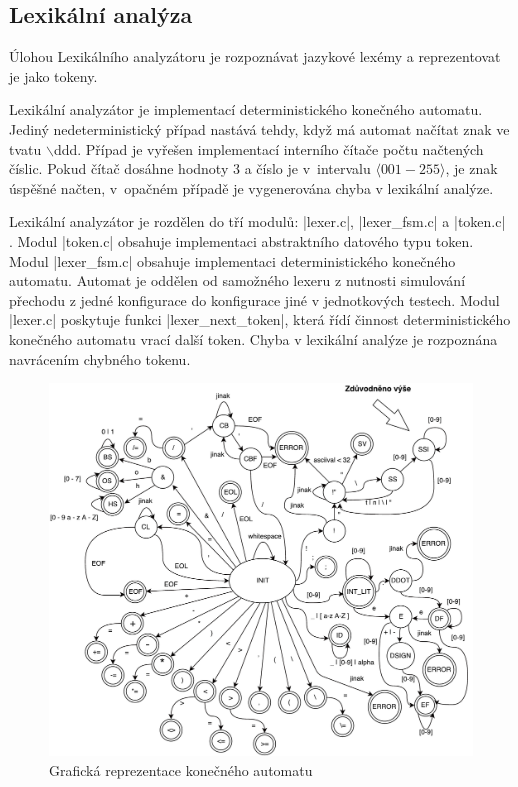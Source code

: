 \subsection{Lexikální analýza}
\label{subsec:lexer}
Úlohou Lexikálního analyzátoru je rozpoznávat jazykové lexémy a reprezentovat
je jako tokeny.

Lexikální analyzátor je implementací deterministického konečného
automatu. Jediný nedeterministický případ nastává tehdy, když má automat načítat znak ve tvatu $\backslash$ddd.
Případ je vyřešen implementací interního čítače počtu načtených číslic. Pokud čítač dosáhne hodnoty 3 a číslo je
v~intervalu $\langle 001 - 255\rangle$, je znak úspěšné načten, v~opačném případě je vygenerována chyba v lexikální
analýze.

Lexikální analyzátor je rozdělen do tří modulů: \ic|lexer.c|, \ic|lexer_fsm.c| a \ic|token.c|
. Modul \ic|token.c| obsahuje implementaci abstraktního datového typu token. Modul \ic|lexer_fsm.c|
obsahuje implementaci deterministického konečného automatu. Automat je oddělen od samožného lexeru z nutnosti simulování
přechodu z jedné konfigurace do konfigurace jiné v jednotkových testech. Modul \ic|lexer.c| poskytuje funkci
\ic|lexer_next_token|, která řídí činnost deterministického konečného automatu vrací další token. Chyba v lexikální
analýze je rozpoznána navrácením chybného tokenu.

\vspace*{16px}
\begin{figure}[htbp]
    \label{subsec:automat}
    \caption{Grafická reprezentace konečného automatu}
    \centering
    \includegraphics[width=1\textwidth, angle=0]{src/assets/automat.pdf}
\end{figure}


